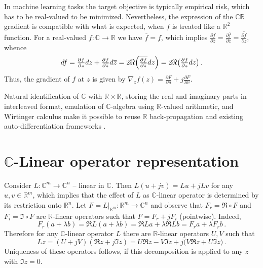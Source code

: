 \documentclass[a4paper,10pt,onecolumn]{article}
\newcommand{\real}{\mathbb{R}}
\newcommand{\cplx}{\mathbb{C}}
\newcommand{\conj}[1]{\overline{#1}}
\begin{document}
In machine learning tasks the target objective is typically empirical risk, which has to
be real-valued to be minimized. Nevertheless, the expression of the $\cplx\real$ gradient
is compatible with what is expected, when $f$ is treated like a $\real^2$ function. For a
real-valued $f\colon \cplx \to \real$ we have $\conj{f} = f$, which implies $
  \tfrac{\partial f}{\partial \conj{z}}
    = \tfrac{\partial \conj{f}}{\partial \conj{z}}
    = \conj{\tfrac{\partial f}{\partial z}}
$, whence
$$
df
  = \tfrac{\partial f}{\partial z} dz
    + \tfrac{\partial f}{\partial \conj{z}} d\conj{z}
  = 2 \Re \Bigl(
    \conj{\tfrac{\partial f}{\partial \conj{z}}} dz
  \Bigr)
  = 2 \Re \bigl(
    \tfrac{\partial f}{\partial z} dz
  \bigr)
  \,. $$
Thus, the gradient of $f$ at $z$ is given by $
  \nabla_z f(z)
    = \tfrac{\partial F}{\partial u}
      + j \tfrac{\partial F}{\partial v}
$.

Natural identification of $\cplx$ with $\real\times \real$, storing the real and imaginary
parts in interleaved format, emulation of $\cplx$-algebra using $\real$-valued arithmetic,
and Wirtinger calculus make it possible to reuse $\real$ back-propagation and existing
auto-differentiation frameworks \citep{trabelsi_deep_2017}.


\section{$\cplx$-Linear operator representation} %
\label{sec:c-linear_operator_representation}

Consider $L \colon \cplx^m \to \cplx^n$ -- linear in $\cplx$. Then $
  L(u + jv) = L u + j L v
$ for any $u, v \in \real^m$, which implies that the effect of $L$ as $\cplx$-linear
operator is determined by its restriction onto $\real^n$. Let $
  F = L\vert_{\real^m}
  \colon \real^m \to \cplx^n
$ and observe that $F_r = \Re \circ F$ and $F_i = \Im \circ F$ are $\real$-linear operators
such that $F = F_r + j F_i$ (pointwise). Indeed,
$$
  F_r(a + \lambda b)
  = \Re L(a + \lambda b)
  = \Re L a + \lambda \Re L b
  = F_r a + \lambda F_r b
  \,. $$
Therefore for any $\cplx$-linear operator $L$ there are $\real$-linear operators $U, V$
such that
$$
L z 
  = (U + j V) (\Re z + j \Im z)
  = U \Re z - V \Im z + j \bigl( V \Re z + U \Im z \bigr)
  \,. $$
Uniqueness of these operators follows, if this decomposition is applied to any $z$ with
$\Im z = 0$.


\end{document}
